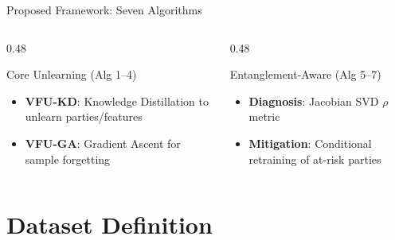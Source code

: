 \documentclass[aspectratio=169, 11pt]{beamer}
\begin{document}
\begin{frame}{Proposed Framework: Seven Algorithms}
\begin{center}
  \end{center}
  \vspace{0.2cm}
  \begin{columns}[T]
    \begin{column}{0.48\textwidth}
      \begin{block}{Core Unlearning (Alg 1--4)}
        \begin{itemize}
          \item \textbf{VFU-KD}: Knowledge Distillation to unlearn parties/features
          \item \textbf{VFU-GA}: Gradient Ascent for sample forgetting
        \end{itemize}
      \end{block}
    \end{column}
    \begin{column}{0.48\textwidth}
      \begin{exampleblock}{Entanglement-Aware (Alg 5--7)}
        \begin{itemize}
          \item \textbf{Diagnosis}: Jacobian SVD $\rho$ metric
          \item \textbf{Mitigation}: Conditional retraining of at-risk parties
        \end{itemize}
      \end{exampleblock}
    \end{column}
  \end{columns}
\end{frame}

\section{Dataset Definition}
\end{document}
